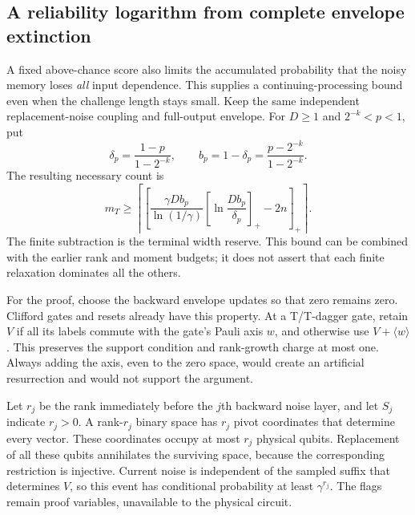 \documentclass[11pt,a4paper]{article}
\begin{document}
\subsection{A reliability logarithm from complete envelope extinction}
A fixed above-chance score also limits the accumulated probability that the noisy memory loses \emph{all} input dependence. This supplies a continuing-processing bound even when the challenge length stays small. Keep the same independent replacement-noise coupling and full-output envelope. For $D\ge1$ and $2^{-k}<p<1$, put
\[
\delta_p=\frac{1-p}{1-2^{-k}},\qquad
b_p=1-\delta_p=\frac{p-2^{-k}}{1-2^{-k}}.
\]
The resulting necessary count is
\begin{equation}
m_T\ge\left\lceil\left[
\frac{\gamma D b_p}{\ln(1/\gamma)}
\left[\ln\frac{D b_p}{\delta_p}\right]_+-2n
\right]_+\right\rceil.
\label{eq:noisy-reliability}
\end{equation}
The finite subtraction is the terminal width reserve. This bound can be combined with the earlier rank and moment budgets; it does not assert that each finite relaxation dominates all the others.

For the proof, choose the backward envelope updates so that zero remains zero. Clifford gates and resets already have this property. At a T/T-dagger gate, retain $V$ if all its labels commute with the gate's Pauli axis $w$, and otherwise use $V+\langle w\rangle$. This preserves the support condition and rank-growth charge at most one. Always adding the axis, even to the zero space, would create an artificial resurrection and would not support the argument.

Let $r_j$ be the rank immediately before the $j$th backward noise layer, and let $S_j$ indicate $r_j>0$. A rank-$r_j$ binary space has $r_j$ pivot coordinates that determine every vector. These coordinates occupy at most $r_j$ physical qubits. Replacement of all these qubits annihilates the surviving space, because the corresponding restriction is injective. Current noise is independent of the sampled suffix that determines $V$, so this event has conditional probability at least $\gamma^{r_j}$. The flags remain proof variables, unavailable to the physical circuit.
\end{document}
